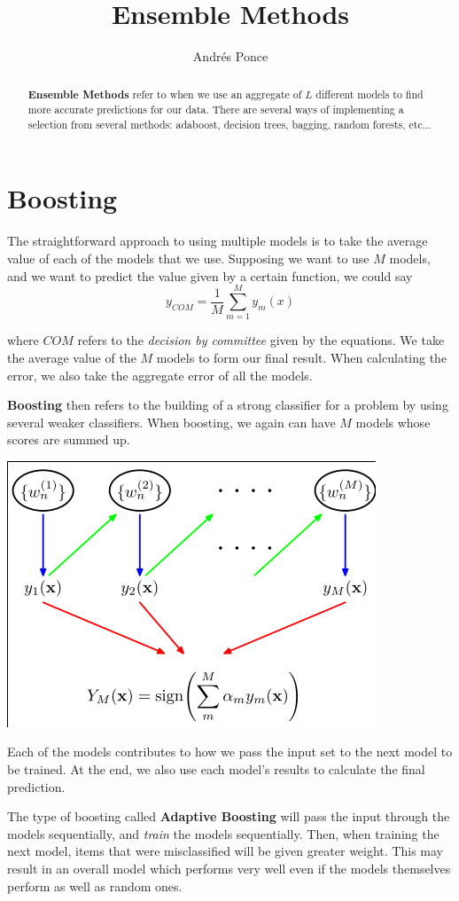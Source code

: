 \documentclass{tufte-handout}
\author{Andr\'es Ponce}
\title{Ensemble Methods}
\begin{document}
\maketitle
\begin{abstract}
	\textbf{Ensemble Methods} refer to when we use an aggregate of $L$ different
	models to find more accurate predictions for our data. There are several 
	ways of implementing a selection from several methods: adaboost, decision trees,
	bagging, random forests, etc...	
\end{abstract}

\section{Boosting}
The straightforward approach to using multiple models is to take the average value of each of the 
models that we use. Supposing we want to use $M$ models, and we want to predict the value given 
by a certain function, we could say 
\[y_{COM} = \frac{1}{M} \sum_{m = 1}^{M}y_{m}(x)\]

where $COM$ refers to the \textit{decision by committee} given by the equations. We take the average
value of the $M$ models to form our final result. When calculating the error, we also take the aggregate
error of all the models.

\textbf{Boosting} then refers to the building of a strong classifier for a problem by using several weaker
classifiers. When boosting, we again can have $M$ models whose scores are summed up. 

\begin{marginfigure}
	\includegraphics[scale=0.4]{adaptive}
	\caption{Each of the models contributes to how we pass the input set to the next model to be trained. 
	At the end, we also use each model's results to calculate the final prediction.}
\end{marginfigure}
The type of boosting called \textbf{Adaptive Boosting} will pass the input through the models
sequentially, and \textit{train} the models sequentially. Then, when training the next model, items that 
were misclassified will be given greater weight. This may result in an overall model which performs 
very well even if the models themselves perform as well as random ones.
\end{document}
